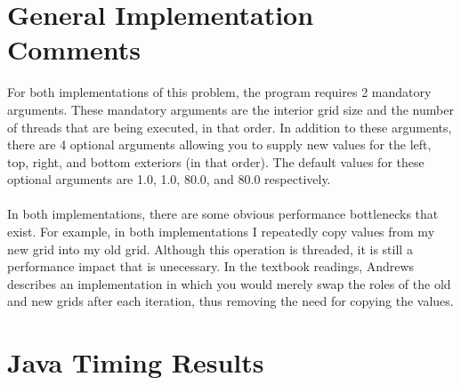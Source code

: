 \documentclass{article}%
\begin{document}
\section{General Implementation Comments}
For both implementations of this problem, the program requires 2 mandatory arguments. These mandatory arguments are the interior grid size and the number of threads that are being executed, in that order. In addition to these arguments, there are 4 optional arguments allowing you to supply new values for the left, top, right, and bottom exteriors (in that order). The default values for these optional arguments are 1.0, 1.0, 80.0, and 80.0 respectively.\\
\\
In both implementations, there are some obvious performance bottlenecks that exist. For example, in both implementations I repeatedly copy values from my new grid into my old grid. Although this operation is threaded, it is still a performance impact that is unecessary. In the textbook readings, Andrews describes an implementation in which you would merely swap the roles of the old and new grids after each iteration, thus removing the need for copying the values.

\section{Java Timing Results}
\end{document}
